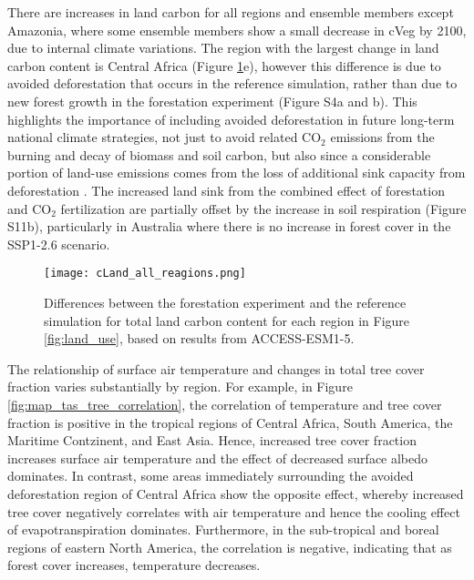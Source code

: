 \documentclass[draft]{agujournal2019}
\begin{document}
There are increases in land carbon for all regions and ensemble members except Amazonia, where some ensemble members show a small decrease in cVeg by 2100, due to internal climate variations.
The region with the largest change in land carbon content is Central Africa (Figure \ref{fig:accesss_regional_cland}e), however this difference is due to avoided deforestation that occurs in the reference simulation, rather than due to new forest growth in the forestation experiment (Figure S4a and b).
This highlights the importance of including avoided deforestation in future long-term national climate strategies, not just to avoid related CO$_2$ emissions from the burning and decay of biomass and soil carbon, but also since a considerable portion of land-use emissions comes from the loss of additional sink capacity from deforestation \cite{gitz_amplifying_2003, pongratz_terminology_2014, obermeier_modelled_2021}.
The increased land sink from the combined effect of forestation and CO$_2$ fertilization are partially offset by the increase in soil respiration (Figure S11b), particularly in Australia where there is no increase in forest cover in the SSP1-2.6 scenario.

\begin{figure}
    \texttt{[image: cLand\_all\_reagions.png]}
    \caption{Differences between the forestation experiment and the reference simulation for total land carbon content for each region in Figure \ref{fig:land_use}, based on results from ACCESS-ESM1-5.}
    \label{fig:accesss_regional_cland}
\end{figure}

The relationship of surface air temperature and changes in total tree cover fraction varies substantially by region.
For example, in Figure \ref{fig:map_tas_tree_correlation}, the correlation of temperature and tree cover fraction is positive in the tropical regions of Central Africa, South America, the Maritime Contzinent, and East Asia.
Hence, increased tree cover fraction increases surface air temperature and the effect of decreased surface albedo dominates.
In contrast, some areas immediately surrounding the avoided deforestation region of Central Africa show the opposite effect, whereby increased tree cover negatively correlates with air temperature and hence the cooling effect of evapotranspiration dominates.
Furthermore, in the sub-tropical and boreal regions of eastern North America, the correlation is negative, indicating that as forest cover increases, temperature decreases.
\end{document}
